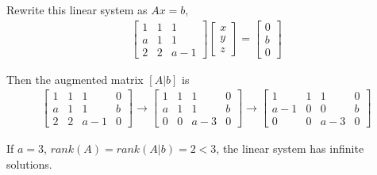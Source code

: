 \documentclass[letterpaper, 11pt]{article}
\newcommand{\1}{\mathds{1}}	%
\theoremstyle{definition}
\begin{document}
Rewrite this linear system as $Ax=b$, \begin{align*}
    \begin{bmatrix}
        1 & 1 & 1   \\
        a & 1 & 1   \\
        2 & 2 & a-1
    \end{bmatrix} \begin{bmatrix}
                      x \\ y \\ z
                  \end{bmatrix} = \begin{bmatrix}
                                      0 \\ b \\ 0
                                  \end{bmatrix}
\end{align*}

Then the augmented matrix $[A|b]$ is \begin{align*}
    \left[\begin{array}{ccc|c}
                  1 & 1 & 1   & 0 \\
                  a & 1 & 1   & b \\
                  2 & 2 & a-1 & 0
              \end{array}\right] \to \left[\begin{array}{ccc|c}
                                               1 & 1 & 1   & 0 \\
                                               a & 1 & 1   & b \\
                                               0 & 0 & a-3 & 0
                                           \end{array}\right] \to \left[\begin{array}{ccc|c}
                                                                            1    & 1 & 1   & 0 \\
                                                                            a -1 & 0 & 0   & b \\
                                                                            0    & 0 & a-3 & 0
                                                                        \end{array}\right]
\end{align*}

If $a = 3$, $rank(A)=rank(A|b) = 2< 3$, the linear system has infinite solutions.
\end{document}
